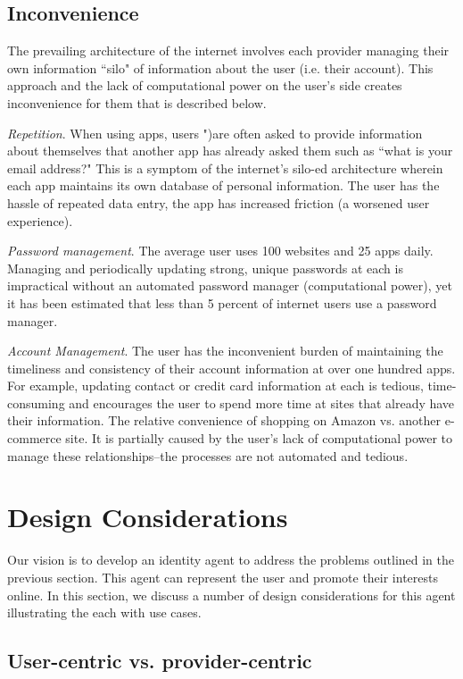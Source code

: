 \documentclass[11pt, oneside]{article}   	%
\begin{document}
\subsection{Inconvenience}
The prevailing architecture of the internet involves each provider managing their own  information ``silo" of information about the user (i.e. their account). This approach and the lack of computational power on the user's side creates inconvenience for them that is described below.

\emph{Repetition}. When using apps, users ")are often asked to provide information about themselves that another app has already asked them such as ``what is your email address?" This is a symptom of the internet's silo-ed architecture wherein each app maintains its own database of personal information. The user has the hassle of repeated data entry, the app has increased friction (a worsened user experience).

\emph{Password management}. The average user uses 100 websites and 25 apps daily. Managing and periodically updating strong, unique passwords at each is  impractical without an automated password manager (computational power), yet it has been estimated that less than 5 percent of internet users use a password manager. 

\emph{Account Management}. The user has the inconvenient burden of maintaining the timeliness and consistency of their account information at over one hundred apps. For example, updating contact or credit card information at each is tedious, time-consuming and encourages the user to spend more time at sites that already have their information. The relative convenience of shopping on Amazon vs. another e-commerce site. It is partially caused by the user's lack of computational power to manage these relationships--the processes are not automated and tedious.

\section{Design Considerations}
Our vision is to develop an identity agent to address the problems outlined in the previous section. This agent  can represent the user and promote their interests online. In this section, we discuss a number of design considerations for this agent illustrating the each with use cases.

\subsection{User-centric vs. provider-centric}
\end{document}
